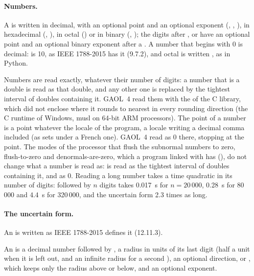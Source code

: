 \documentclass[12pt,a4paper,twoside,openright]{book}
\begin{document}
\paragraph{Numbers.} A  is written in decimal, with an optional
point and an optional exponent (, , ), in
hexadecimal (, ), in octal () or in
binary (, ); the digits after , 
or  have an optional point and an optional binary exponent after a
.\newinvfive{} A number that begins with 0 is decimal:  is
10, as IEEE 1788-2015 has it (9.7.2), and octal is written , as
in Python.
%

Numbers are read exactly, whatever their number of digits: a number that is
a double is read as that double, and any other one is replaced by the
tightest interval of doubles containing it.\newinvfive{} GAOL~4 read them
with the  of the C library, which did not enclose 
where it rounds to nearest in every rounding direction (the C runtime of
Windows, musl on 64-bit ARM processors). The point of a number is a point
whatever the locale of the program, a locale writing a decimal comma
included (as  sets under a French
one).\newinvfive{} GAOL~4 read  as 0 there, 
stopping at the point. The modes of the processor that flush the subnormal
numbers to zero, flush-to-zero and denormals-are-zero, which a program
linked with  has (), do not change what a
number is read as:  is read as the tightest interval of doubles
containing it, and  as 0.\newinvfive{} Reading a long number takes a
time quadratic in its number of digits:  followed by $n$ digits
 takes 0.017~s for $n = 20\,000$, 0.28~s for 80\,000 and 4.4~s for
320\,000, and the uncertain form 2.3 times as long.\newinvfive

\paragraph{The uncertain form.} An  is written as
IEEE 1788-2015 defines it (12.11.3).
%

\begin{Def}
An  is a decimal number followed by , a radius
in units of its last digit (half a unit when it is left out, and an infinite
radius for a second ), an optional direction,  or ,
which keeps only the radius above or below, and an optional exponent.
\end{Def}
\end{document}
